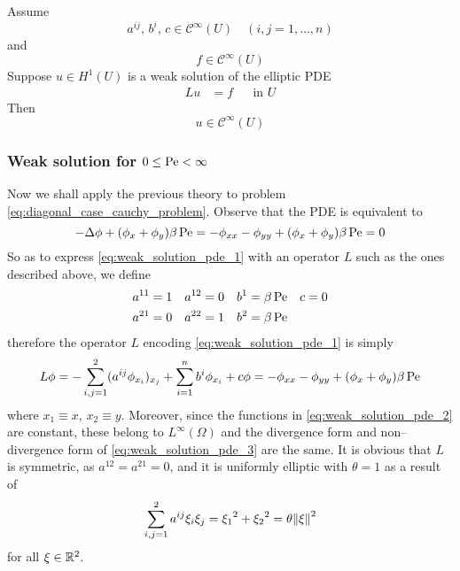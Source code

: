 \begin{theorem}
	Assume
	\[
		a^{ij}, \, b^i, \, c \in \mathcal{C}^\infty(U) \quad 
		(i,j = 1, \ldots, n)	
	\]
	and
	\[
		f \in \mathcal{C}^\infty(U)
	\]
	Suppose $u \in H^1(U)$ is a weak solution of the elliptic PDE
	\[
		\begin{aligned}
			L u &= f & &\text{in } U
		\end{aligned}	
	\]
	Then
	\[
		u \in \mathcal{C}^\infty(U)
	\]
\end{theorem}

\subsubsection*{Weak solution for \texorpdfstring{$0 \leq \mathrm{Pe} <
\infty$}{finite Péclet's number}}

Now we shall apply the previous theory to problem
\eqref{eq:diagonal_case_cauchy_problem}. Observe that the PDE is equivalent to
\begin{equation} \label{eq:weak_solution_pde_1}
	-\Delta \phi + (\phi_x + \phi_y) \beta \, \mathrm{Pe} = 
	-\phi_{xx} - \phi_{yy} + (\phi_x + \phi_y) \beta \, \mathrm{Pe} = 0
\end{equation}
So as to express \eqref{eq:weak_solution_pde_1} with an operator $L$ such as the
ones described above, we define
\begin{equation} \label{eq:weak_solution_pde_2}
	\begin{aligned}
		a^{11} &= 1 	& 	a^{12} &= 0 	& 	b^1 &= \beta \, \mathrm{Pe}	& 	c &= 0 \\
		a^{21} &= 0 	& 	a^{22} &= 1 	& 	b^2 &= \beta \, \mathrm{Pe}
	\end{aligned}
\end{equation}
therefore the operator $L$ encoding \eqref{eq:weak_solution_pde_1} is simply
\begin{equation} \label{eq:weak_solution_pde_3}
	L \phi = 
	-\sum_{i,j=1}^2 (a^{ij} \phi_{x_i})_{x_j} + \sum_{i=1}^n b^i \phi_{x_i} + c \phi =
	-\phi_{xx} - \phi_{yy} + (\phi_x + \phi_y) \beta \, \mathrm{Pe} 
\end{equation}
where $x_1 \equiv x, \, x_2 \equiv y$. Moreover, since the functions in
\eqref{eq:weak_solution_pde_2} are constant, these belong to $L^\infty(\Omega)$
and the divergence form and non--divergence form of
\eqref{eq:weak_solution_pde_3} are the same. It is obvious that $L$ is
symmetric, as $a^{12} = a^{21} = 0$, and it is uniformly elliptic with $\theta = 1$ as a result of
\begin{equation}
	\sum_{i,j=1}^2 a^{ij} \xi_i \xi_j = 
	{\xi_1}^2 + {\xi_2}^2 = \theta \norm{\xi}^2
\end{equation}
for all $\xi \in \mathbb{R}^2$.

